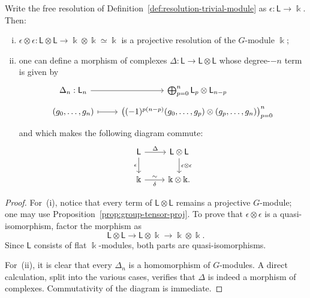 \begin{lemma}\label{prop:cup-resolution}
	Write the free resolution of Definition~\ref{def:resolution-trivial-module}
	as $\epsilon:\mathsf{L}\to\Bbbk$. Then:
	\begin{enumerate}[(i)]
		\item $\epsilon\otimes\epsilon:\mathsf{L}\otimes\mathsf{L}
		\to\Bbbk\otimes\Bbbk\simeq\Bbbk$ is a projective resolution of the
		$G$-module $\Bbbk$;
		\item one can define a morphism of complexes
		$\Delta:\mathsf{L}\to\mathsf{L}\otimes\mathsf{L}$ whose degree-$-n$
		term is given by
		\[\begin{tikzcd}[row sep=tiny]
			\Delta_n: \mathsf{L}_n \arrow[r] & \bigoplus_{p=0}^n \mathsf{L}_p \otimes \mathsf{L}_{n-p} \\
			(g_0, \ldots, g_n) \arrow[mapsto, r] & \left( (-1)^{p(n-p)} (g_0, \ldots, g_p) \otimes (g_p, \ldots, g_n) \right)_{p=0}^n
		\end{tikzcd}\]
		and which makes the following diagram commute:
		\[\begin{tikzcd}
			\mathsf{L} \arrow[r, "\Delta"] \arrow[d, "\epsilon"'] & \mathsf{L} \otimes \mathsf{L} \arrow[d, "{\epsilon \otimes \epsilon}"] \\
			\Bbbk \arrow[r, "\sim", "\delta"'] & \Bbbk \otimes \Bbbk .
		\end{tikzcd}\]
	\end{enumerate}
\end{lemma}

\begin{proof}
	For~(i), notice that every term of $\mathsf{L}\otimes\mathsf{L}$ remains a
	projective $G$-module; one may use
	Proposition~\ref{prop:group-tensor-proj}. To prove that
	$\epsilon\otimes\epsilon$ is a quasi-isomorphism, factor the morphism as
	\[ \mathsf{L} \otimes \mathsf{L} \to \mathsf{L} \otimes \Bbbk \to \Bbbk \otimes \Bbbk. \]
	Since $\mathsf{L}$ consists of flat $\Bbbk$-modules, both parts are
	quasi-isomorphisms.

	For~(ii), it is clear that every $\Delta_n$ is a homomorphism of
	$G$-modules. A direct calculation, split into the various cases, verifies
	that $\Delta$ is indeed a morphism of complexes. Commutativity of the
	diagram is immediate.
\end{proof}

